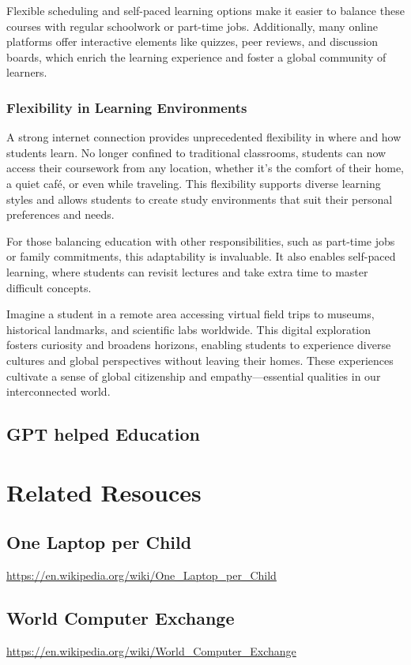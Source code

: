 \documentclass[a4paper,11pt]{article}
\begin{document}
Flexible scheduling and self-paced learning options make it easier to balance these courses with regular schoolwork or part-time jobs. Additionally, many online platforms offer interactive elements like quizzes, peer reviews, and discussion boards, which enrich the learning experience and foster a global community of learners.

\subsubsection{Flexibility in Learning Environments}
A strong internet connection provides unprecedented flexibility in where and how students learn. No longer confined to traditional classrooms, students can now access their coursework from any location, whether it’s the comfort of their home, a quiet café, or even while traveling. This flexibility supports diverse learning styles and allows students to create study environments that suit their personal preferences and needs.

For those balancing education with other responsibilities, such as part-time jobs or family commitments, this adaptability is invaluable. It also enables self-paced learning, where students can revisit lectures and take extra time to master difficult concepts.


Imagine a student in a remote area accessing virtual field trips to museums, historical landmarks, and scientific labs worldwide. This digital exploration fosters curiosity and broadens horizons, enabling students to experience diverse cultures and global perspectives without leaving their homes. These experiences cultivate a sense of global citizenship and empathy—essential qualities in our interconnected world.



\subsection{GPT helped Education}

\section{Related Resouces}
\subsection{One Laptop per Child}
\url{https://en.wikipedia.org/wiki/One\_Laptop\_per\_Child}

\subsection{World Computer Exchange}
\url{https://en.wikipedia.org/wiki/World\_Computer\_Exchange}
\end{document}
